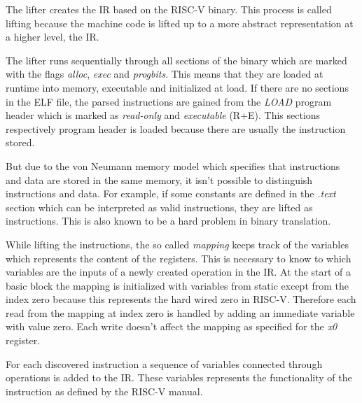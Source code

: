 \documentclass[course=eragp]{aspdoc}
\begin{document}

The lifter creates the IR based on the RISC-V binary. This process is called lifting because the
machine code is lifted up to a more abstract representation at a higher level, the IR.

\par

The lifter runs sequentially through all sections of the binary which are marked with the flags
\emph{alloc}, \emph{exec} and \emph{progbits}. This means that they are loaded at runtime into
memory, executable and initialized at load. If there are no sections in the ELF file, the parsed
instructions are gained from the \emph{LOAD} program header which is marked as \emph{read-only} and
\emph{executable} (R+E). This sections respectively program header is loaded because there are
usually the instruction stored.

\par

But due to the von Neumann memory model which specifies that instructions and data
are stored in the same memory, it isn't possible to distinguish instructions and data. For example,
if some constants are defined in the \emph{.text} section which can be interpreted as valid
instructions, they are lifted as instructions. This is also known to be a hard problem in
binary translation.

\par

While lifting the instructions, the so called \emph{mapping} keeps track of the variables which
represents the content of the registers. This is necessary to know to which variables are the inputs
of a newly created operation in the IR. At the start of a basic block the mapping is initialized
with variables from static except from the index zero because this represents the hard wired zero in
RISC-V. Therefore each read from the mapping at index zero is handled by adding an immediate
variable with value zero. Each write doesn't affect the mapping as specified for the \emph{x0}
register.\cite{rvspec}

\par

For each discovered instruction a sequence of variables connected through operations is added to the
IR. These variables represents the functionality of the instruction as defined by the RISC-V manual.
\end{document}
